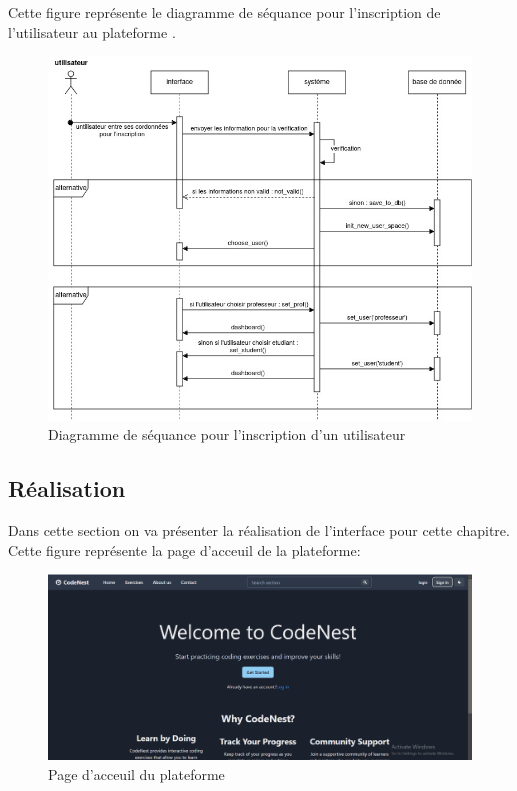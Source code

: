 Cette figure représente le diagramme de séquance pour l'inscription de l'utilisateur au plateforme .\\
\begin{figure}[h!]
\center
  \includegraphics[width=0.65\linewidth]{pages/image/asma-diagramme_sequence-inscription.jpg}
    \caption{Diagramme de séquance  pour l'inscription d'un utilisateur}
    \label{fig:enter-label}
\end{figure}





















\subsection{Réalisation}
Dans cette section on va présenter la réalisation de l'interface pour cette chapitre.
Cette figure représente la page d'acceuil de la plateforme:
\begin{figure}[h!]
    \centering
    \includegraphics[width=0.9
    \linewidth]{pages/images/interface1.png}
    \caption{Page d'acceuil du plateforme}
    \label{fig:enter-label}
\end{figure}
\\ 



